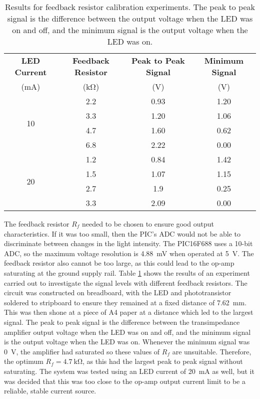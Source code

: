 \begin{table}[h]
	\centering
	\caption{Results for feedback resistor calibration experiments. The peak to peak signal is the difference between the output voltage when the LED was on and off, and the minimum signal is the output voltage when the LED was on.}
	\label{tab: tia feedback resistor}
	\begin{tabular}{|c|c|c|c|}
		\hline
		\textbf{LED Current} & \textbf{Feedback Resistor} & \textbf{Peak to Peak Signal} & \textbf{Minimum Signal}\\
		(mA)	&	(\si{\kilo\ohm})	&	(V)	&	(V)\\
		\hline
		\multirow{4}{*}{10}	&	2.2	&	0.93	&	1.20\\
						\cline{2-4}
						&	3.3	&	1.20	&	1.06\\
						\cline{2-4}
						&	4.7	&	1.60	&	0.62\\
						\cline{2-4}
						&	6.8	&	2.22	&	0.00\\
		\hline
		\multirow{4}{*}{20}	&	1.2	&	0.84	&	1.42\\
						\cline{2-4}
						&	1.5	&	1.07	&	1.15\\
						\cline{2-4}
						&	2.7	&	1.9	&	0.25\\
						\cline{2-4}
						&	3.3	&	2.09	&	0.00\\
		\hline
	\end{tabular}
\end{table}

The feedback resistor $R_f$ needed to be chosen to ensure good output characteristics. If it was too small, then the PIC's ADC would not be able to discriminate between changes in the light intensity.  The PIC16F688 uses a 10-bit ADC, so the maximum voltage resolution is \SI{4.88}{\milli\volt} when operated at \SI{5}{\volt}. The feedback resistor also cannot be too large, as this could lead to the op-amp saturating at the ground supply rail. Table \ref{tab: tia feedback resistor} shows the results of an experiment carried out to investigate the signal levels with different feedback resistors. The circuit was constructed on breadboard, with the LED and phototransistor soldered to stripboard to ensure they remained at a fixed distance of \SI{7.62}{\milli\metre}. This was then shone at a piece of A4 paper at a distance which led to the largest signal. The peak to peak signal is the difference between the transimpedance amplifier output voltage when the LED was on and off, and the minimum signal is the output voltage when the LED was on. Whenever the minimum signal was \SI{0}{\volt}, the amplifier had saturated so these values of $R_f$ are unsuitable. Therefore, the optimum $R_f = \SI{4.7}{\kilo\ohm}$, as this had the largest peak to peak signal without saturating. The system was tested using an LED current of \SI{20}{\milli\ampere} as well, but it was decided that this was too close to the op-amp output current limit to be a reliable, stable current source.\\

